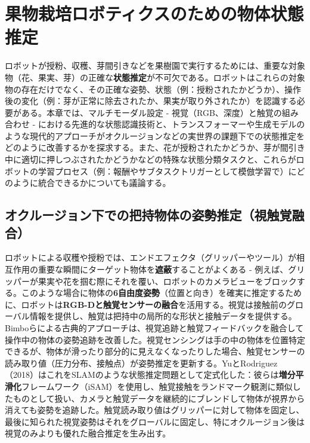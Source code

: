 \documentclass[a4paper,fleqn,10pt,twocolumn]{template_v1.0}
\begin{document}
\section{果物栽培ロボティクスのための物体状態推定}
ロボットが授粉、収穫、芽間引きなどを果樹園で実行するためには、重要な対象物（花、果実、芽）の正確な\textbf{状態推定}が不可欠である。ロボットはこれらの対象物の存在だけでなく、その正確な姿勢、状態（例：授粉されたかどうか）、操作後の変化（例：芽が正常に除去されたか、果実が取り外されたか）を認識する必要がある。本章では、マルチモーダル設定 - 視覚（RGB、深度）と触覚の組み合わせ - における先進的な状態認識技術と、トランスフォーマーや生成モデルのような現代的アプローチがオクルージョンなどの実世界の課題下での状態推定をどのように改善するかを探求する。また、花が授粉されたかどうか、芽が間引き中に適切に押しつぶされたかどうかなどの特殊な状態分類タスクと、これらがロボットの学習プロセス（例：報酬やサブタスクトリガーとして模倣学習で）にどのように統合できるかについても議論する。

\subsection{オクルージョン下での把持物体の姿勢推定（視触覚融合）}
ロボットによる収穫や授粉では、エンドエフェクタ（グリッパーやツール）が相互作用の重要な瞬間にターゲット物体を\textbf{遮蔽}することがよくある - 例えば、グリッパーが果実や花を掴む際にそれを覆い、ロボットのカメラビューをブロックする。このような場合に物体の\textbf{6自由度姿勢}（位置と向き）を確実に推定するために、ロボットは\textbf{RGB-Dと触覚センサーの融合}を活用する。視覚は接触前のグローバル情報を提供し、触覚は把持中の局所的な形状と接触データを提供する。Bimboらによる古典的アプローチは、視覚追跡と触覚フィードバックを融合して操作中の物体の姿勢追跡を改善した\cite{Bimbo2012}。視覚センシングは手の中の物体を位置特定できるが、物体が滑ったり部分的に見えなくなったりした場合、触覚センサーの読み取り値（圧力分布、接触点）が姿勢推定を更新する。YuとRodriguez（2018）はこれをSLAMのような状態推定問題として定式化した：彼らは\textbf{増分平滑化}フレームワーク（iSAM）を使用し、触覚接触をランドマーク観測に類似したものとして扱い、カメラと触覚データを継続的にブレンドして物体が視界から消えても姿勢を追跡した\cite{Yu2018}。触覚読み取り値はグリッパーに対して物体を固定し、最後に知られた視覚姿勢はそれをグローバルに固定し、特にオクルージョン後は視覚のみよりも優れた融合推定を生み出す。
\end{document}
